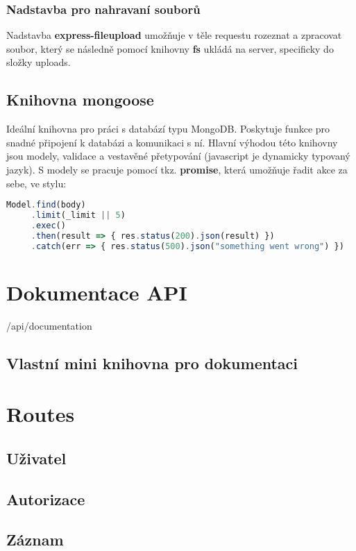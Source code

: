 \subsubsection{Nadstavba pro nahravaní souborů}
Nadstavba \textbf{express-fileupload} umožňuje v těle requestu rozeznat a zpracovat soubor, který
se následně pomocí knihovny \textbf{fs} ukládá na server, specificky do složky uploads.

\subsection{Knihovna mongoose}
Ideální knihovna pro práci s databází typu MongoDB.
Poskytuje funkce pro snadné připojení k databázi a komunikaci s ní.
Hlavní výhodou této knihovny jsou modely, validace a vestavěné přetypování
(javascript je dynamicky typovaný jazyk). 
S modely se pracuje pomocí tkz. \textbf{promise}, která umožňuje řadit
akce za sebe, ve stylu:
\begin{lstlisting}[language=JavaScript]
Model.find(body)
     .limit(_limit || 5)
     .exec()
     .then(result => { res.status(200).json(result) })
     .catch(err => { res.status(500).json("something went wrong") })
\end{lstlisting}

\section{Dokumentace API}

/api/documentation




\subsection{Vlastní mini knihovna pro dokumentaci}

\section{Routes}
\subsection{Uživatel}
\subsection{Autorizace}
\subsection{Záznam}
